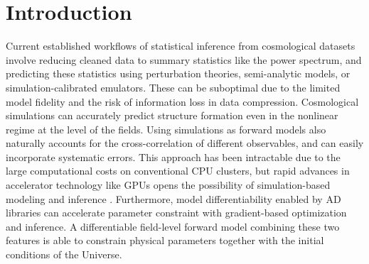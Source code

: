 \documentclass[modern, trackchanges, dvipsnames]{aastex631}
\newcommand{\pmwd}{{\usefont{T1}{nova}{m}{sl}pmwd}}
\begin{document}
\begin{abstract}

Rapid advances in deep learning have brought not only myriad powerful
neural networks, but also breakthroughs that benefit established
scientific research.
In particular, automatic differentiation (AD) tools and computational
accelerators like GPUs have facilitated forward modeling of the Universe
with differentiable simulations.
Current differentiable cosmological simulations are limited by memory,
thus are subject to a trade-off between time and space/mass resolution.
They typically integrate for only tens of time steps, unlike the
standard non-differentiable simulations.
We present a new approach free of such constraints, using the adjoint
method and reverse time integration.
It enables larger and more accurate forward modeling, and will improve
gradient based optimization and inference.
We implement it in a particle-mesh (PM) $N$-body library \pmwd\
(particle-mesh with derivatives).
Based on the powerful AD system \texttt{JAX}, \pmwd\ is fully
differentiable, and is highly performant on GPUs.

\end{abstract}



\vspace{1em}
\section{Introduction}

Current established workflows of statistical inference from cosmological
datasets involve reducing cleaned data to summary statistics like the
power spectrum, and predicting these statistics using perturbation
theories, semi-analytic models, or simulation-calibrated emulators.
These can be suboptimal due to the limited model fidelity and the
risk of information loss in data compression.
Cosmological simulations \citep{HockneyEastwood1988, AnguloHahn2022} can
accurately predict structure formation even in the nonlinear regime at
the level of the fields.
Using simulations as forward models also naturally accounts for the
cross-correlation of different observables, and can easily incorporate
systematic errors.
This approach has been intractable due to the large computational costs
on conventional CPU clusters, but rapid advances in accelerator
technology like GPUs opens the possibility of simulation-based modeling
and inference \citep{CranmerEtAl2020}.
Furthermore, model differentiability enabled by AD libraries can
accelerate parameter constraint with gradient-based optimization and
inference.
A differentiable field-level forward model combining these two features
is able to constrain physical parameters together with the initial
conditions of the Universe.
\end{document}
